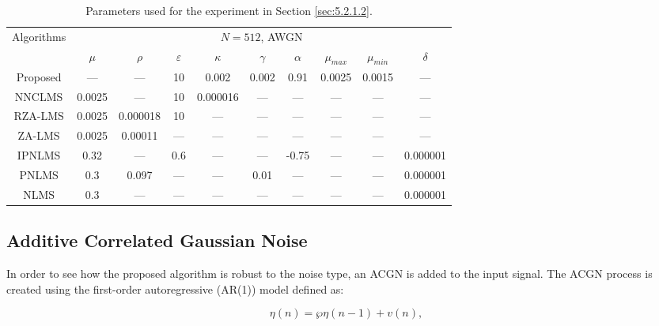 \begin{table}[!htb]
\centering
\caption{Parameters used for the experiment in Section \ref{sec:5.2.1.2}.}
\vspace{0.5cm}
\begin{tabular}{|c|c|c|c|c|c|c|c|c|c|}
 \hline
    \multirow{2}{*}{Algorithms} & \multicolumn{9}{c|}{$N=512$, AWGN}\\
    \cline{2-10}
    & $\mu$ & $\rho$ & $\varepsilon$ & $\kappa$ & $\gamma$ &$\alpha$ &$\mu_{max}$& $\mu_{min}$ & $\delta$\\
    \hline
     Proposed  & --- & --- & 10 & 0.002 & 0.002& 0.91 & 0.0025 & 0.0015 & ---  \\ \hline
     NNCLMS  & 0.0025 & ---  & 10  & 0.000016 & --- & --- & --- & --- & ---  \\ \hline
   RZA-LMS & 0.0025 & 0.000018 & 10 & --- & --- & --- & --- & --- & ---  \\ \hline
   ZA-LMS  & 0.0025 & 0.00011 & --- & --- & --- & --- & --- & --- & ---  \\ \hline
   IPNLMS & 0.32 & --- & 0.6 & --- & --- & -0.75 & --- & --- & 0.000001 \\ \hline
   PNLMS & 0.3 & 0.097 & --- & --- & 0.01 & --- & --- & --- & 0.000001 \\ \hline
   NLMS & 0.3 & --- & --- & --- & --- & --- & --- & --- &  0.000001\\ \hline
\end{tabular}
\label{table2}
 \end{table}

\vspace{-0.3cm}
\subsection{Additive Correlated Gaussian Noise}\label{sec:5.2.2}
\vspace{-0.5cm}
\noindent In order to see how the proposed algorithm is robust to the noise type, an ACGN is added to the input signal. The ACGN process is created using the first-order autoregressive (AR(1)) model defined as:

\vspace{-1cm}
\begin{equation}
\eta(n)=\wp\eta(n-1)+v(n),\label{eq_1q}
\end{equation}
\vspace{-1cm}

